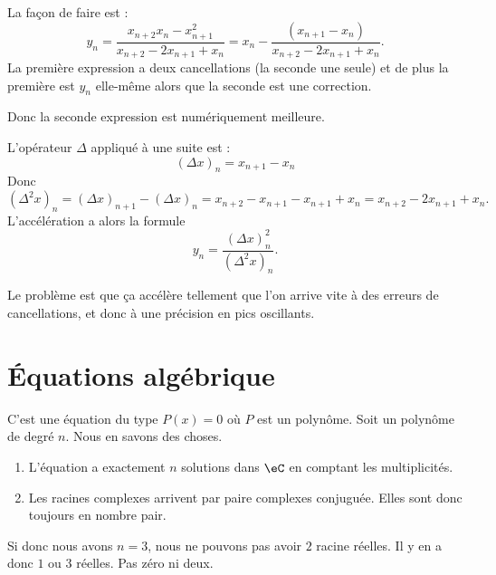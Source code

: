 La façon de faire est :
\begin{equation}
	y_n=\frac{ x_{n+2}x_n-x_{n+1}^2 }{ x_{n+2}-2x_{n+1}+x_n }=x_n-\frac{ (x_{n+1}-x_n) }{ x_{n+2}-2x_{n+1}+x_n }.
\end{equation}
La première expression a deux cancellations (la seconde une seule) et de plus la première est \( y_n\) elle-même alors que la seconde est une correction.

Donc la seconde expression est numériquement meilleure.

L'opérateur \( \Delta\) appliqué à une suite est :
\begin{equation}
	(\Delta x)_n=x_{n+1}-x_n
\end{equation}
Donc
\begin{equation}
	(\Delta^2x)_n= (\Delta x)_{n+1}-(\Delta x)_n=x_{n+2}-x_{n+1}-x_{n+1}+x_n=x_{n+2}-2x_{n+1}+x_n.
\end{equation}
L'accélération a alors la formule
\begin{equation}
	y_n=\frac{ (\Delta x)_n^2 }{ (\Delta^2x)_n }.
\end{equation}

Le problème est que ça accélère tellement que l'on arrive vite à des erreurs de cancellations, et donc à une précision en pics oscillants.

\section{Équations algébrique}

C'est une équation du type \( P(x)=0\) où \( P\) est un polynôme. Soit un polynôme de degré \( n\). Nous en savons des choses.

\begin{enumerate}
	\item
	      L'équation a exactement \( n\) solutions dans \( \eC\) en comptant les multiplicités.
	\item
	      Les racines complexes arrivent par paire complexes conjuguée. Elles sont donc toujours en nombre pair.
\end{enumerate}

Si donc nous avons \( n=3\), nous ne pouvons pas avoir \( 2\) racine réelles. Il y en a donc \( 1\) ou \( 3\) réelles. Pas zéro ni deux.

